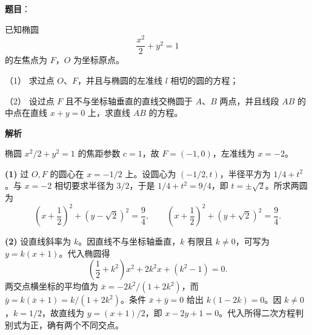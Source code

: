 \begin{answer}

\textbf{题目}：

已知椭圆
\nopagebreak[4]
\[
\frac{x^2}{2}+y^2=1
\]
的左焦点为 $F$，$O$ 为坐标原点。

（1） 求过点 $O$、$F$，并且与椭圆的左准线 $l$ 相切的圆的方程；

（2） 设过点 $F$ 且不与坐标轴垂直的直线交椭圆于 $A$、$B$ 两点，并且线段 $AB$ 的中点在直线 $x+y=0$ 上，求直线 $AB$ 的方程。
\nopagebreak[4]
\begin{center}\end{center}
\nopagebreak[4]
\textbf{解析}

椭圆 $x^2/2+y^2=1$ 的焦距参数 $c=1$，故 $F=(-1,0)$，左准线为 $x=-2$。
\nopagebreak[4]
\begin{center}\end{center}
\nopagebreak[4]
\textbf{(1)} 过 $O,F$ 的圆心在 $x=-1/2$ 上。设圆心为 $(-1/2,t)$，半径平方为 $1/4+t^2$。与 $x=-2$ 相切要求半径为 $3/2$，于是 $1/4+t^2=9/4$，即 $t=\pm\sqrt2$。所求两圆为
\nopagebreak[4]
\[
\left(x+\frac12\right)^2+(y-\sqrt2)^2=\frac94,\qquad
\left(x+\frac12\right)^2+(y+\sqrt2)^2=\frac94.
\]

\textbf{(2)} 设直线斜率为 $k$。因直线不与坐标轴垂直，$k$ 有限且 $k\ne0$，可写为 $y=k(x+1)$。代入椭圆得
\nopagebreak[4]
\[
\left(\frac12+k^2\right)x^2+2k^2x+(k^2-1)=0.
\]
两交点横坐标的平均值为 $\bar x=-2k^2/(1+2k^2)$，而 $\bar y=k(\bar x+1)=k/(1+2k^2)$。条件 $\bar x+\bar y=0$ 给出 $k(1-2k)=0$。因 $k\ne0$，$k=1/2$，故直线为 $y=(x+1)/2$，即 $x-2y+1=0$。代入所得二次方程判别式为正，确有两个不同交点。



\end{answer}
